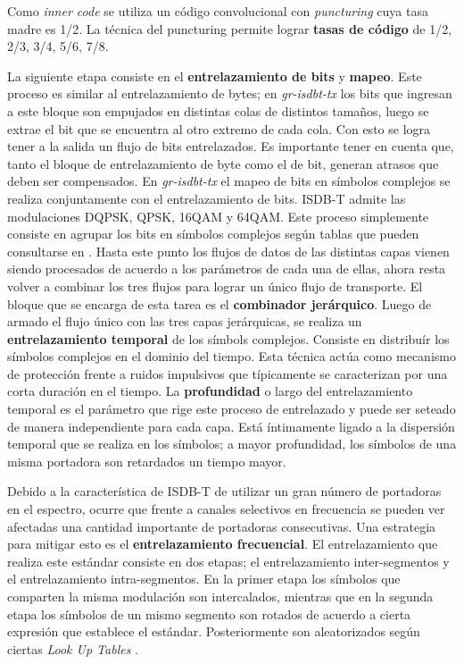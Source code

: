 \documentclass[journal,comsoc]{IEEEtran}
\begin{document}
Como \textit{inner code} se utiliza un código convolucional con \textit{puncturing} cuya tasa madre es 1/2. La técnica del puncturing permite lograr \textbf{tasas de código} de 1/2, 2/3, 3/4, 5/6, 7/8.

La siguiente etapa consiste en el \textbf{entrelazamiento de bits} y \textbf{mapeo}. Este proceso es similar al entrelazamiento de bytes; en \textit{gr-isdbt-tx} los bits que ingresan a este bloque son empujados en distintas colas de distintos tamaños, luego se extrae el bit que se encuentra al otro extremo de cada cola. Con esto se logra tener a la salida un flujo de bits entrelazados. Es importante tener en cuenta que, tanto el bloque de entrelazamiento de byte como el de bit, generan atrasos que deben ser compensados.
En \textit{gr-isdbt-tx} el mapeo de bits en símbolos complejos se realiza conjuntamente con el entrelazamiento de bits. ISDB-T admite las modulaciones DQPSK, QPSK, 16QAM y 64QAM. Este proceso simplemente consiste en agrupar los bits en símbolos complejos según tablas que pueden consultarse en \cite{norma}.
Hasta este punto los flujos de datos de las distintas capas vienen siendo procesados de acuerdo a los parámetros de cada una de ellas, ahora resta volver a combinar los tres flujos para lograr un único flujo de transporte. El bloque que se encarga de esta tarea es el \textbf{combinador jerárquico}.
Luego de armado el flujo único con las tres capas jerárquicas, se realiza un \textbf{entrelazamiento temporal} de los símbols complejos. Consiste en distribuír los símbolos complejos en el dominio del tiempo. Esta técnica actúa como mecanismo de protección frente a ruidos impulsivos que típicamente se caracterizan por una corta duración en el tiempo. La \textbf{profundidad} o largo del entrelazamiento temporal es el parámetro que rige este proceso de entrelazado y puede ser seteado de manera independiente para cada capa. Está íntimamente ligado a la dispersión temporal que se realiza en los símbolos; a mayor profundidad, los símbolos de una misma portadora son retardados un tiempo mayor.

Debido a la característica de ISDB-T de utilizar un gran número de portadoras en el espectro, ocurre que frente a canales selectivos en frecuencia se pueden ver afectadas una cantidad importante de portadoras consecutivas. Una estrategia para mitigar esto es el \textbf{entrelazamiento frecuencial}. El entrelazamiento que realiza este estándar consiste en dos etapas; el entrelazamiento inter-segmentos y el entrelazamiento intra-segmentos. En la primer etapa los símbolos que comparten la misma modulación son intercalados, mientras que en la segunda etapa los símbolos de un mismo segmento son rotados de acuerdo a cierta expresión que establece el estándar. Posteriormente son aleatorizados según ciertas \textit{Look Up Tables} \cite{norma}.
\end{document}
